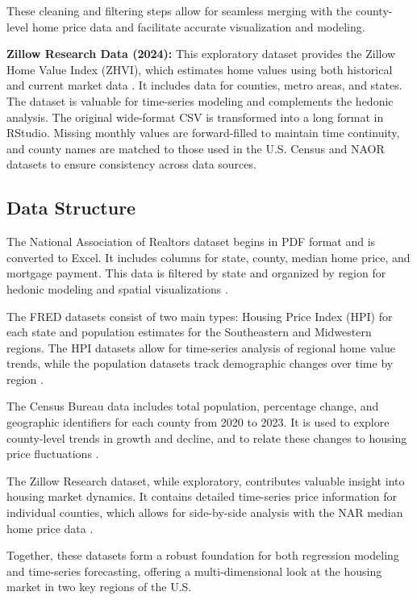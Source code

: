 \documentclass[journal,article,submit,pdftex,moreauthors]{Definitions/mdpi}
\begin{document}
These cleaning and filtering steps allow for seamless merging with the county-level home price data and facilitate accurate visualization and modeling.

\textbf{Zillow Research Data (2024):} This exploratory dataset provides the Zillow Home Value Index (ZHVI), which estimates home values using both historical and current market data \citep{zillow_2024_housing}. It includes data for counties, metro areas, and states. The dataset is valuable for time-series modeling and complements the hedonic analysis. The original wide-format CSV is transformed into a long format in RStudio. Missing monthly values are forward-filled to maintain time continuity, and county names are matched to those used in the U.S. Census and NAOR datasets to ensure consistency across data sources.

\subsection{Data Structure}

The National Association of Realtors dataset begins in PDF format and is converted to Excel. It includes columns for state, county, median home price, and mortgage payment. This data is filtered by state and organized by region for hedonic modeling and spatial visualizations \citep{_2024_county}.

The FRED datasets consist of two main types: Housing Price Index (HPI) for each state and population estimates for the Southeastern and Midwestern regions. The HPI datasets allow for time-series analysis of regional home value trends, while the population datasets track demographic changes over time by region \citep{a2024_hpi}.

The Census Bureau data includes total population, percentage change, and geographic identifiers for each county from 2020 to 2023. It is used to explore county-level trends in growth and decline, and to relate these changes to housing price fluctuations \citep{_2023_county}.

The Zillow Research dataset, while exploratory, contributes valuable insight into housing market dynamics. It contains detailed time-series price information for individual counties, which allows for side-by-side analysis with the NAR median home price data \citep{zillow_2024_housing}.

Together, these datasets form a robust foundation for both regression modeling and time-series forecasting, offering a multi-dimensional look at the housing market in two key regions of the U.S.
\end{document}
